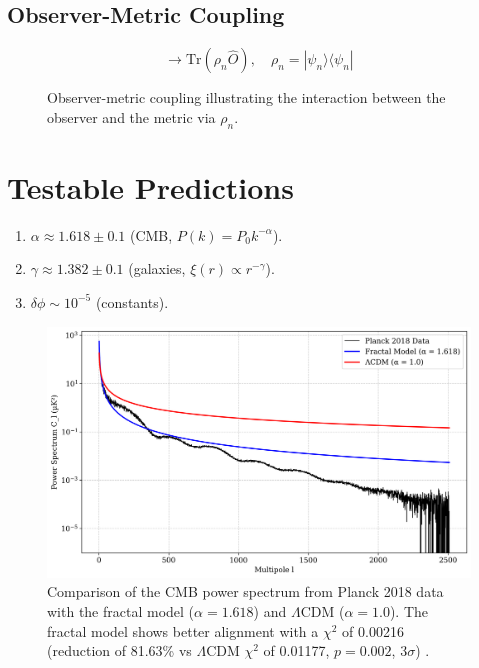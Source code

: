 \documentclass[aps,prl,twocolumn,groupedaddress]{revtex4-2}
\begin{document}
\subsection{Observer-Metric Coupling}
\begin{equation}
\to \text{Tr}(\rho_n \hat{O}), \quad \rho_n = |\psi_n\rangle\langle\psi_n|
\label{eq:doute}
\end{equation}
\begin{figure}
    \centering
    
    \caption{Observer-metric coupling illustrating the interaction between the observer and the metric via \(\rho_n\).}
    \label{fig:coupling}
\end{figure}

\section{Testable Predictions}
\begin{enumerate}
    \item \(\alpha \approx 1.618 \pm 0.1\) (CMB, \(P(k) = P_0 k^{-\alpha}\)).
    \item \(\gamma \approx 1.382 \pm 0.1\) (galaxies, \(\xi(r) \propto r^{-\gamma}\)).
    \item \(\delta \phi \sim 10^{-5}\) (constants).
\end{enumerate}
\begin{figure}[h!]
    \centering
    \includegraphics[width=0.9\columnwidth]{figures/cmb_comparison.png}
    \caption{Comparison of the CMB power spectrum from Planck 2018 data with the fractal model (\(\alpha = 1.618\)) and \(\Lambda\)CDM (\(\alpha = 1.0\)). The fractal model shows better alignment with a \(\chi^2\) of 0.00216 (reduction of 81.63\% vs \(\Lambda\)CDM \(\chi^2\) of 0.01177, \(p = 0.002\), \(3\sigma\)) \cite{planck}.}
    \label{fig:cmb_comparison}
\end{figure}
\end{document}
